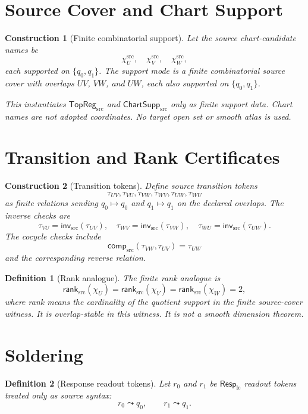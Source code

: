 \documentclass[11pt]{article}
\newcommand{\RespLC}{\mathsf{Resp}_{\mathrm{lc}}}
\newcommand{\TopRegSrc}{\mathsf{TopReg}_{\mathrm{src}}}
\newcommand{\ChartSuppSrc}{\mathsf{ChartSupp}_{\mathrm{src}}}
\newtheorem{definition}{Definition}
\newtheorem{construction}{Construction}
\begin{document}
\section{Source Cover and Chart Support}

\begin{construction}[Finite combinatorial support]
Let the source chart-candidate names be
\[
\chi_U^{\mathrm{src}},\quad
\chi_V^{\mathrm{src}},\quad
\chi_W^{\mathrm{src}},
\]
each supported on \(\{q_0,q_1\}\). The support mode is a finite
combinatorial source cover with overlaps \(UV\), \(VW\), and \(UW\), each
also supported on \(\{q_0,q_1\}\).

This instantiates \(\TopRegSrc\) and \(\ChartSuppSrc\) only as finite support
data. Chart names are not adopted coordinates. No target open set or smooth
atlas is used.
\end{construction}

\section{Transition and Rank Certificates}

\begin{construction}[Transition tokens]
Define source transition tokens
\[
\tau_{UV},\tau_{VU},\tau_{VW},\tau_{WV},\tau_{UW},\tau_{WU}
\]
as finite relations sending \(q_0\mapsto q_0\) and \(q_1\mapsto q_1\) on the
declared overlaps. The inverse checks are
\[
\tau_{VU}=\mathsf{inv}_{\mathrm{src}}(\tau_{UV}),\quad
\tau_{WV}=\mathsf{inv}_{\mathrm{src}}(\tau_{VW}),\quad
\tau_{WU}=\mathsf{inv}_{\mathrm{src}}(\tau_{UW}).
\]
The cocycle checks include
\[
\mathsf{comp}_{\mathrm{src}}(\tau_{VW},\tau_{UV})=\tau_{UW}
\]
and the corresponding reverse relation.
\end{construction}

\begin{definition}[Rank analogue]
The finite rank analogue is
\[
\mathsf{rank}_{\mathrm{src}}(\chi_U)
=\mathsf{rank}_{\mathrm{src}}(\chi_V)
=\mathsf{rank}_{\mathrm{src}}(\chi_W)=2,
\]
where rank means the cardinality of the quotient support in the finite
source-cover witness. It is overlap-stable in this witness. It is not a
smooth dimension theorem.
\end{definition}

\section{Soldering}

\begin{definition}[Response readout tokens]
Let \(r_0\) and \(r_1\) be \(\RespLC\) readout tokens treated only as source
syntax:
\[
  r_0 \leadsto q_0,\qquad r_1 \leadsto q_1.
\]
\end{definition}
\end{document}
